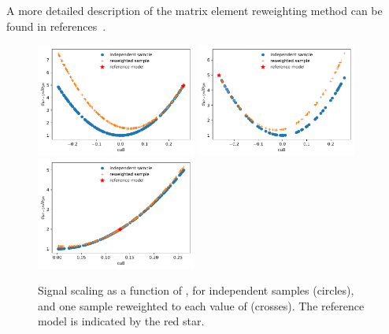A more detailed description of the matrix element reweighting method can be
found in references~\cite{Mattelaer2016,Gainer2014}.
\begin{figure}
  \includegraphics[width=0.47\textwidth]{figures/reweighting/low_1d_unreweighted_and_weighted}%
  \includegraphics[width=0.47\textwidth]{figures/reweighting/high_1d_unreweighted_and_weighted}
  \includegraphics[width=0.47\textwidth]{figures/reweighting/mid_1d_unreweighted_and_weighted}
  \caption[Signal scaling as a function of \cuB and reference model]{Signal scaling as a function of \cuB, for independent samples (circles), and one sample reweighted to each value of \cuB (crosses). The reference model is indicated by the red star.}
  \label{fig:reweighting-ref}
\end{figure}

